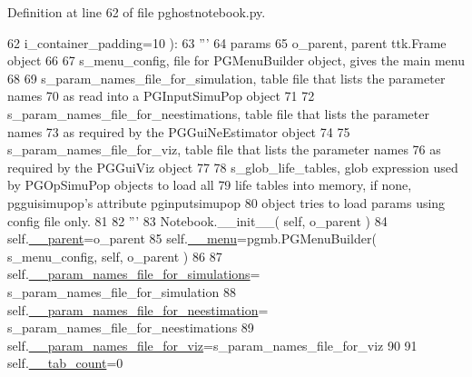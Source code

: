 Definition at line 62 of file pghostnotebook.\+py.


\begin{DoxyCode}
62                         i\_container\_padding=10 ):
63         \textcolor{stringliteral}{'''}
64 \textcolor{stringliteral}{        params }
65 \textcolor{stringliteral}{        o\_parent, parent ttk.Frame object}
66 \textcolor{stringliteral}{}
67 \textcolor{stringliteral}{        s\_menu\_config, file for PGMenuBuilder object, gives the main menu}
68 \textcolor{stringliteral}{}
69 \textcolor{stringliteral}{        s\_param\_names\_file\_for\_simulation, table file that lists the parameter names }
70 \textcolor{stringliteral}{        as read into a PGInputSimuPop object}
71 \textcolor{stringliteral}{}
72 \textcolor{stringliteral}{        s\_param\_names\_file\_for\_neestimations, table file that lists the parameter names }
73 \textcolor{stringliteral}{        as required by the PGGuiNeEstimator object}
74 \textcolor{stringliteral}{}
75 \textcolor{stringliteral}{        s\_param\_names\_file\_for\_viz, table file that lists the parameter names }
76 \textcolor{stringliteral}{        as required by the PGGuiViz object}
77 \textcolor{stringliteral}{}
78 \textcolor{stringliteral}{        s\_glob\_life\_tables, glob expression used by PGOpSimuPop objects to load all }
79 \textcolor{stringliteral}{        life tables into memory, if none, pgguisimupop's attribute pginputsimupop }
80 \textcolor{stringliteral}{        object tries to load params using config file only.}
81 \textcolor{stringliteral}{}
82 \textcolor{stringliteral}{        '''}
83         Notebook.\_\_init\_\_( self, o\_parent )
84         self.\hyperlink{classnegui_1_1pghostnotebook_1_1PGHostNotebook_ae3a4078b5e41c208da268dfee99bb622}{\_\_parent}=o\_parent
85         self.\hyperlink{classnegui_1_1pghostnotebook_1_1PGHostNotebook_add1ab1bb7f792ff733e8236fed00218c}{\_\_menu}=pgmb.PGMenuBuilder( s\_menu\_config, self, o\_parent )
86 
87         self.\hyperlink{classnegui_1_1pghostnotebook_1_1PGHostNotebook_a9b145ef56ff954c480d856859fcda86e}{\_\_param\_names\_file\_for\_simulations}=
      s\_param\_names\_file\_for\_simulation
88         self.\hyperlink{classnegui_1_1pghostnotebook_1_1PGHostNotebook_a38f70ee82a0a2852953b964623a4c871}{\_\_param\_names\_file\_for\_neestimation}=
      s\_param\_names\_file\_for\_neestimations
89         self.\hyperlink{classnegui_1_1pghostnotebook_1_1PGHostNotebook_ace33b52316ef64f62d42c956fb785c76}{\_\_param\_names\_file\_for\_viz}=s\_param\_names\_file\_for\_viz
90 
91         self.\hyperlink{classnegui_1_1pghostnotebook_1_1PGHostNotebook_a84a7417cc57500cbe5c230449ba464b3}{\_\_tab\_count}=0

\end{DoxyCode}
